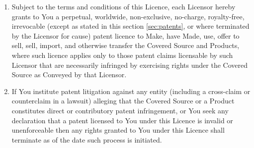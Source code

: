 \documentclass[10pt, a4paper]{article}
\begin{document}
\begin{enumerate}[label=\ref*{sec:patents}.\arabic*]
\item

Subject to the terms and conditions of this Licence, each Licensor hereby grants to You a perpetual, worldwide, non-exclusive, no-charge, royalty-free, irrevocable (except as stated in this section \ref*{sec:patents}, or where terminated by the Licensor for cause) patent licence to Make, have Made, use, offer to sell, sell, import, and otherwise transfer the Covered Source and Products, where such licence applies only to those patent claims licensable by such Licensor that are necessarily infringed by exercising rights under the Covered Source as Conveyed by that Licensor. 
\item
If You institute patent litigation against any entity (including a cross-claim or counterclaim in a lawsuit) alleging that the Covered Source or a Product constitutes direct or contributory patent infringement, or You seek any declaration that a patent licensed to You under this Licence is invalid or unenforceable then any rights granted to You under this Licence shall terminate as of the date such process is initiated.
\end{enumerate}
\end{document}
